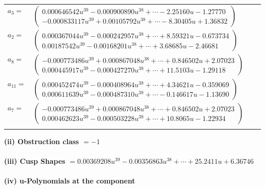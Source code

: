 \documentclass[1p]{elsarticle_modified}
\theoremstyle{definition}
\begin{document}
\begin{tabular}{m{7pt} m{180pt} m{7pt} m{180pt} }
\flushright $a_{3}=$&$\begin{pmatrix}0.000646542 u^{39}-0.000900890 u^{38}+\cdots-2.25160 u-1.27770\\-0.000833117 u^{39}+0.00105792 u^{38}+\cdots-8.30405 u+1.36832\end{pmatrix}$ \\
\flushright $a_{2}=$&$\begin{pmatrix}0.000367044 u^{39}-0.000242957 u^{38}+\cdots+8.59321 u-0.673734\\0.00187542 u^{39}-0.00168201 u^{38}+\cdots+3.68685 u-2.46681\end{pmatrix}$ \\
\flushright $a_{8}=$&$\begin{pmatrix}-0.000773486 u^{39}+0.000867048 u^{38}+\cdots+0.846502 u+2.07023\\0.000445917 u^{39}-0.000427270 u^{38}+\cdots+11.5103 u-1.29118\end{pmatrix}$ \\
\flushright $a_{11}=$&$\begin{pmatrix}0.000452474 u^{39}-0.000408964 u^{38}+\cdots+4.34621 u-0.359069\\0.000611639 u^{39}-0.000487310 u^{38}+\cdots-0.146617 u-1.13690\end{pmatrix}$ \\
\flushright $a_{7}=$&$\begin{pmatrix}-0.000773486 u^{39}+0.000867048 u^{38}+\cdots+0.846502 u+2.07023\\0.000462623 u^{39}-0.000503228 u^{38}+\cdots+10.8065 u-1.22934\end{pmatrix}$\\&\end{tabular}
\flushleft \textbf{(ii) Obstruction class $= -1$}\\~\\
\flushleft \textbf{(iii) Cusp Shapes $= 0.00369208 u^{39}-0.00356863 u^{38}+\cdots+25.2411 u+6.36746$}\\~\\
\newpage\renewcommand{\arraystretch}{1}
\flushleft \textbf{(iv) u-Polynomials at the component}\newline \\
\end{document}
